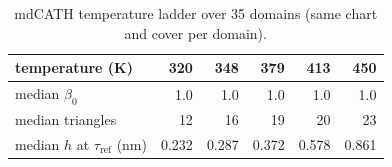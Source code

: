 \begin{table}[H]\centering\small\begin{tabular}{lrrrrr}\toprule temperature (K) & 320 & 348 & 379 & 413 & 450\\\midrule
median $\beta_0$ & 1.0 & 1.0 & 1.0 & 1.0 & 1.0\\
median triangles & 12 & 16 & 19 & 20 & 23\\
median $h$ at $\tau_{\mathrm{ref}}$ (nm) & 0.232 & 0.287 & 0.372 & 0.578 & 0.861\\
\bottomrule\end{tabular}\caption{mdCATH temperature ladder over 35 domains (same chart and cover per domain).}\label{tab:temperature}\end{table}
